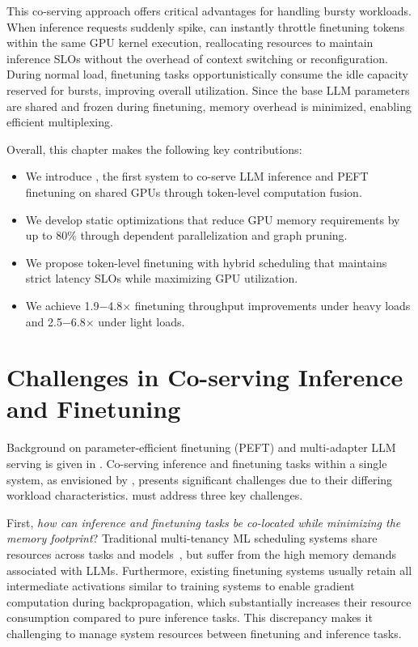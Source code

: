 This co-serving approach offers critical advantages for handling bursty workloads. When inference requests suddenly spike, \FlexLLM can instantly throttle finetuning tokens within the same GPU kernel execution, reallocating resources to maintain inference SLOs without the overhead of context switching or reconfiguration. During normal load, finetuning tasks opportunistically consume the idle capacity reserved for bursts, improving overall utilization. Since the base LLM parameters are shared and frozen during finetuning, memory overhead is minimized, enabling efficient multiplexing.

Overall, this chapter makes the following key contributions:
\begin{itemize}
\item We introduce \FlexLLM, the first system to co-serve LLM inference and PEFT finetuning on shared GPUs through token-level computation fusion.
\item We develop static optimizations that reduce GPU memory requirements by up to 80\% through dependent parallelization and graph pruning.
\item We propose token-level finetuning with hybrid scheduling that maintains strict latency SLOs while maximizing GPU utilization.
\item We achieve 1.9$-$4.8$\times$ finetuning throughput improvements under heavy loads and 2.5$-$6.8$\times$ under light loads.
\end{itemize}

\section{Challenges in Co-serving Inference and Finetuning}
\label{flexllm:sec:challenges}
Background on parameter-efficient finetuning (PEFT) and multi-adapter LLM serving is given in . Co-serving inference and finetuning tasks within a single system, as envisioned by \FlexLLM, presents significant challenges due to their differing workload characteristics. \FlexLLM must address three key challenges.

First, \emph{how can inference and finetuning tasks be co-located while minimizing the memory footprint}?
Traditional multi-tenancy ML scheduling systems share resources across tasks and models~\cite{xiao2018gandiva}, but suffer from the high memory demands associated with LLMs.
Furthermore, existing finetuning systems usually retain all intermediate activations similar to training systems to enable gradient computation during backpropagation, which substantially increases their resource consumption compared to pure inference tasks. This discrepancy makes it challenging to manage system resources between finetuning and inference tasks.

